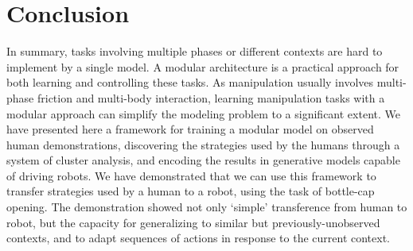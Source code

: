 
\section{Conclusion}
\label{sec:conclusion}
In summary, tasks involving multiple phases or different contexts are
hard to implement by a single model. A modular architecture is a
practical approach for both learning and controlling these tasks. As
manipulation usually involves multi-phase friction and multi-body
interaction, learning manipulation tasks with a modular approach can
simplify the modeling problem to a significant extent. We have
presented here a framework for training a modular model on observed
human demonstrations, discovering the strategies used by the humans
through a system of cluster analysis, and encoding
the results in generative models capable of driving robots. We have
demonstrated that we can use this framework to transfer strategies
used by a human to a robot, using the task of bottle-cap
opening. The demonstration showed not only `simple' transference from
human to robot, but the capacity for generalizing to similar but
previously-unobserved contexts, and to adapt sequences of actions in
response to the current context.




